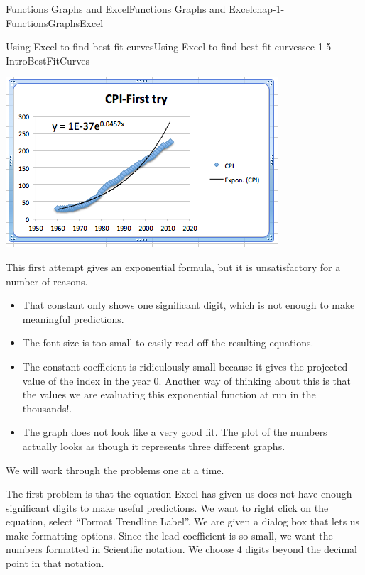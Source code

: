 \documentclass[oneside,10pt,]{book}
\numberwithin{equation}{section}
\begin{document}
\begin{chapterptx}{Functions Graphs and Excel}{}{Functions Graphs and Excel}{}{}{chap-1-FunctionsGraphsExcel}
\begin{sectionptx}{Using Excel to find best-fit curves}{}{Using Excel to find best-fit curves}{}{}{sec-1-5-IntroBestFitCurves}
\begin{sidebyside}{1}{0.1}{0.1}{0}
\begin{sbspanel}{0.8}
\includegraphics[width=1\linewidth]{images/sec1-5-10.png}
\end{sbspanel}%
\end{sidebyside}%
%
\par
\hypertarget{p-392}{}%
This first attempt gives an exponential formula, but it is unsatisfactory for a number of reasons.%
\leavevmode%
\begin{itemize}[label=\textbullet]
\item{}\hypertarget{p-393}{}%
That constant only shows one significant digit, which is not enough to make meaningful predictions.%
\item{}\hypertarget{p-394}{}%
The font size is too small to easily read off the resulting equations.%
\item{}\hypertarget{p-395}{}%
The constant coefficient is ridiculously small because it gives the projected value of the index in the year 0. Another way of thinking about this is that the values we are evaluating this exponential function at run in the thousands!.%
\item{}\hypertarget{p-396}{}%
The graph does not look like a very good fit.  The plot of the numbers actually looks as though it represents three different graphs.%
\end{itemize}
\hypertarget{p-397}{}%
We will work through the problems one at a time.%
\par
\hypertarget{p-398}{}%
The first problem is that the equation Excel has given us does not have enough significant digits to make useful predictions.  We want to right click on the equation, select “Format Trendline Label”.  We are given a dialog box that lets us make formatting options.  Since the lead coefficient is so small, we want the numbers formatted in Scientific notation.  We choose 4 digits beyond the decimal point in that notation. \leavevmode%

\end{sectionptx}
\end{chapterptx}
\end{document}
